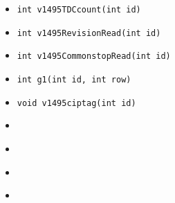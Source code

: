 \documentclass[11pt]{article}
\begin{document}
\begin{itemize}
		\item
			\begin{lstlisting}
int v1495TDCcount(int id)			
			\end{lstlisting}
			
		\item
			\begin{lstlisting}
int v1495RevisionRead(int id)			
			\end{lstlisting}			

		\item
			\begin{lstlisting}
int v1495CommonstopRead(int id)			
			\end{lstlisting}
			
		\item
			\begin{lstlisting}
int g1(int id, int row)
			\end{lstlisting}
			
		\item
			\begin{lstlisting}
void v1495ciptag(int id)			
			\end{lstlisting}
			
		\item
			\begin{lstlisting}
					
			\end{lstlisting}									

		\item
			\begin{lstlisting}
					
			\end{lstlisting}

		\item
			\begin{lstlisting}
						
			\end{lstlisting}

		\item
			\begin{lstlisting}
						
			\end{lstlisting}
												
		\end{itemize}
	
\end{document}
